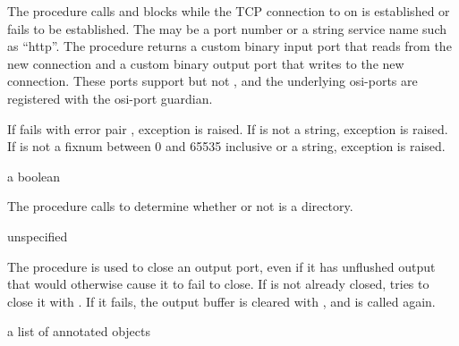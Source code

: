 The  procedure calls  and
blocks while the TCP connection to  on 
is established or fails to be established.  The  may be
a port number or a string service name such as ``http''. The procedure
returns a custom binary input port that reads from the new connection
and a custom binary output port that writes to the new
connection. These ports support  but not
, and the underlying osi-ports are registered
with the osi-port guardian.

If  fails with error pair , exception  is
raised.  If  is not a string, exception  is raised. If  is not a
fixnum between 0 and 65535 inclusive or a string, exception
 is raised.

\begin{procedure}
\end{procedure}
\returns{} a boolean

The  procedure calls  to
determine whether or not  is a directory.

\begin{procedure}
\end{procedure}
\returns{} unspecified

The  procedure is used to close an
output port, even if it has unflushed output that would otherwise
cause it to fail to close.  If  is not already closed,
 tries to close it with
. If it fails, the output buffer is
cleared with , and
 is called again.

\begin{procedure}
\end{procedure}
\returns{} a list of annotated objects

